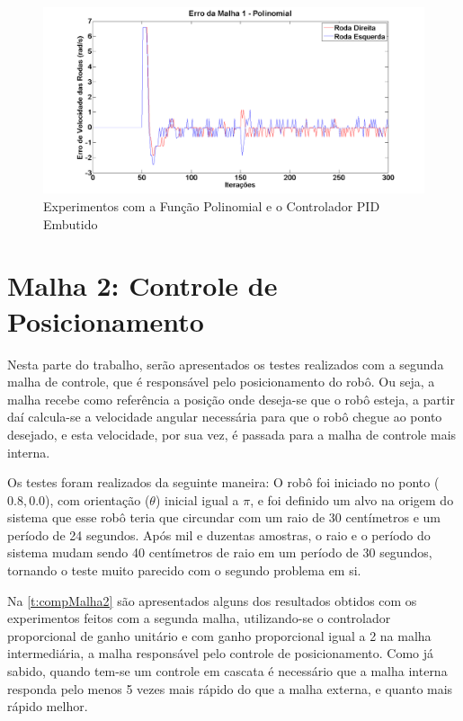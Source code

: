  \begin{figure}[!htb]
 	\centering
	\includegraphics[width=.9\linewidth]{./Testes/Malha1/Polinomial/Polinomial}
 	\caption{Experimentos com a Função Polinomial e o Controlador PID Embutido}
 	\label{fig:pol}
 \end{figure}
 
 \section{Malha 2: Controle de Posicionamento}
 \label{m2}
 Nesta parte do trabalho, serão apresentados os testes realizados com a segunda malha de controle, que é responsável pelo posicionamento do robô. Ou seja, a malha recebe como referência a posição onde deseja-se que o robô esteja, a partir daí calcula-se a velocidade angular necessária para que o robô chegue ao ponto desejado, e esta velocidade, por sua vez, é passada para a malha de controle mais interna. 
 
 Os testes foram realizados da seguinte maneira: O robô foi iniciado no ponto ($0.8,0.0$), com orientação ($\theta$) inicial igual a $\pi$, e foi definido um alvo na origem do sistema que esse robô teria que circundar com um raio de 30 centímetros e um período de 24 segundos. Após mil e duzentas amostras, o raio e o período do sistema mudam sendo 40 centímetros de raio em um período de 30 segundos, tornando o teste muito parecido com o segundo problema em si.
 
 Na \autoref{t:compMalha2} são apresentados alguns dos resultados obtidos com os experimentos feitos com a segunda malha, utilizando-se o controlador proporcional de ganho unitário e com ganho proporcional igual a 2 na malha intermediária, a malha responsável pelo controle de posicionamento. Como já sabido, quando tem-se um controle em cascata é necessário que a malha interna responda pelo menos 5 vezes mais rápido do que a malha externa, e quanto mais rápido melhor.
 
